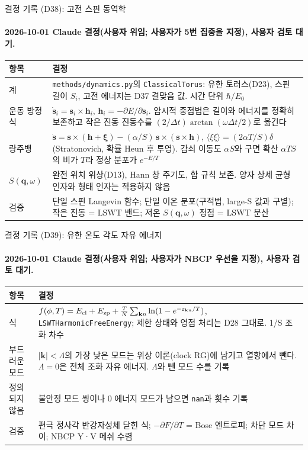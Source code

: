 \begin{frame}[label=decisions-d38-dynamics]{결정 기록 (D38): 고전 스핀 동역학}
  \framesubtitle{2026-10-01 Claude 결정(사용자 위임; 사용자가 5번 집중을 지정), 사용자 검토 대기.}
  \small\renewcommand{\arraystretch}{1.12}
  \begin{tabularx}{\textwidth}{@{}P{3.0cm}Y@{}}
    \toprule
    항목 & 결정 \\
    \midrule
    계 & \texttt{methods/dynamics.py}의 \texttt{ClassicalTorus}: 유한 토러스(D23), 스핀 길이 $S_i$, 고전 에너지는 D37 결맞음 값. 시간 단위 $\hbar/E_0$ \\
    운동 방정식 & $\dot{\mathbf s}_i=\mathbf s_i\times\mathbf h_i$, $\mathbf h_i=-\partial E/\partial\mathbf s_i$. 암시적 중점법은 길이와 에너지를 정확히 보존하고 작은 진동 진동수를 $(2/\Delta t)\arctan(\omega\Delta t/2)$로 옮긴다 \\
    랑주뱅 & $\dot{\mathbf s}=\mathbf s\times(\mathbf h+\boldsymbol\xi)-(\alpha/S)\,\mathbf s\times(\mathbf s\times\mathbf h)$, $\langle\xi\xi\rangle=(2\alpha T/S)\delta$ (Stratonovich, 확률 Heun 후 투영). 감쇠 이동도 $\alpha S$와 구면 확산 $\alpha TS$의 비가 $T$라 정상 분포가 $e^{-E/T}$ \\
    $S(\mathbf q,\omega)$ & 완전 위치 위상(D13), Hann 창 주기도, 합 규칙 보존. 양자 상세 균형 인자와 형태 인자는 적용하지 않음 \\
    검증 & 단일 스핀 Langevin 함수; 단일 이온 분포(구적법, large-S 값과 구별); 작은 진동 = LSWT 밴드; 저온 $S(\mathbf q,\omega)$ 정점 = LSWT 분산 \\
    \bottomrule
  \end{tabularx}
\end{frame}

\begin{frame}[label=decisions-d39-free-energy]{결정 기록 (D39): 유한 온도 각도 자유 에너지}
  \framesubtitle{2026-10-01 Claude 결정(사용자 위임; 사용자가 NBCP 우선을 지정), 사용자 검토 대기.}
  \small\renewcommand{\arraystretch}{1.12}
  \begin{tabularx}{\textwidth}{@{}P{3.0cm}Y@{}}
    \toprule
    항목 & 결정 \\
    \midrule
    식 & $f(\phi,T)=E_{\rm cl}+E_{\rm zp}+\frac{T}{N}\sum_{\mathbf k n}\ln(1-e^{-\varepsilon_{\mathbf k n}/T})$, \texttt{LSWTHarmonicFreeEnergy}; 제한 상태와 영점 처리는 D28 그대로. 1/S 조화 차수 \\
    부드러운 모드 & $|\mathbf k|<\Lambda$의 가장 낮은 모드는 위상 이론(clock RG)에 남기고 열항에서 뺀다. $\Lambda=0$은 전체 조화 자유 에너지. $\Lambda$와 뺀 모드 수를 기록 \\
    정의되지 않음 & 불안정 모드 쌍이나 0 에너지 모드가 남으면 \texttt{nan}과 횟수 기록 \\
    검증 & 편극 정사각 반강자성체 닫힌 식; $-\partial F/\partial T$ = Bose 엔트로피; 차단 모드 차이; NBCP Y·V 메쉬 수렴 \\
    \bottomrule
  \end{tabularx}
\end{frame}


